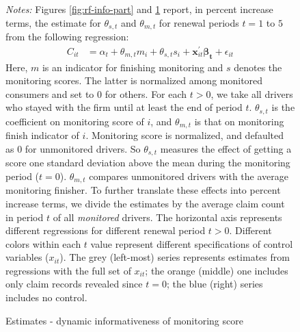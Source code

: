 \begin{figure}[htbp!]
\centering
{}
\caption{Estimates - dynamic informativeness of monitoring participation\label{fig:rf-info-part}}
\vspace{0.5cm}
\caption{Estimates - dynamic informativeness of monitoring score \label{fig:rf-info-score}}
\vspace{0.25cm}
\begin{minipage}{0.9\textwidth}
	{\footnotesize \emph{Notes: }Figures \ref{fig:rf-info-part} and \ref{fig:rf-info-score} report, in percent increase terms, the estimate for $\theta_{s,t}$ and $\theta_{m,t}$ for renewal periods $t=1$ to $5$ from the following regression: \begin{align}
C_{it} & =\alpha_{t}+\theta_{m,t}m_{i}+\theta_{s,t}s_{i}+\mathbf{x}_{it}^{\prime}\mathbf{\beta_{t}}+\epsilon_{it}\label{eq:private_info_reg}
\end{align}
 Here, $m$ is an indicator for finishing monitoring and $s$ denotes the monitoring scores. The latter is normalized among monitored consumers and set to $0$ for others.     For each $t>0$, we take all drivers who stayed with the firm until at least the end of period $t$. $\theta_{s,t}$ is the coefficient on monitoring score of $i$, and $\theta_{m,t}$ is that on monitoring finish indicator of $i$. Monitoring score is normalized, and defaulted as 0 for unmonitored drivers. So $\theta_{s,t}$ measures the effect of getting a score one standard deviation above the mean during the monitoring period ($t=0$). $\theta_{m,t}$ compares unmonitored drivers with the average monitoring finisher. To further translate these effects into percent increase terms, we divide the estimates by the average claim count in period $t$ of all \emph{monitored} drivers. The horizontal axis represents different regressions for different renewal period $t>0$.
	Different colors within each $t$ value represent
	different specifications of control variables ($x_{it}$). The grey (left-most) series represents estimates from regressions with the full set of $x_{it}$; the orange (middle) one includes only claim records revealed since $t=0$; the blue (right) series includes no control. \par}
\end{minipage}
\end{figure}


